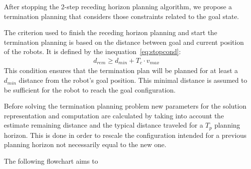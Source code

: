 
After stopping the 2-step receding horizon planning algorithm, we propose a 
termination planning that considers those constraints related to
the goal state.



The criterion used to finish the receding 
horizon planning and start the termination planning is based on the distance between
goal and current position of the robots. It is defined by the inequation~\ref{eq:stopcond}:
\begin{align}\label{eq:stopcond}
  d_{rem} \geq d_{min} + T_c \cdot v_{max}
\end{align}
This condition ensures that the termination plan will be planned for at least a 
$d_{min}$ distance from the robot's goal position.
This minimal distance is assumed to be sufficient for the robot to reach the 
goal configuration.

Before solving the termination planning problem new parameters for 
the solution representation and computation are calculated by taking into
account the estimate remaining distance and the typical distance traveled
for a $T_p$ planning horizon.
This is done in order to rescale the configuration intended for a previous 
planning horizon not necessarily equal to the new one. 

The following flowchart aims to 

